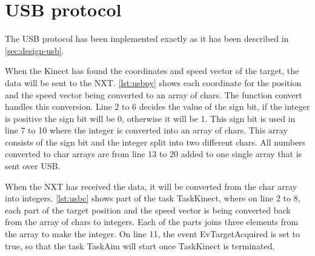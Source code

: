 \section{USB protocol}
The USB protocol has been implemented exactly as it has been described in \autoref{sec:design-usb}.

When the Kinect has found the coordinates and speed vector of the target, the data will be sent to the NXT. \autoref{lst:usbpy} shows each coordinate for the position and the speed vector being converted to an array of chars. The function convert handles this conversion. Line 2 to 6 decides the value of the sign bit, if the integer is positive the sign bit will be 0, otherwise it will be 1. This sign bit is used in line 7 to 10 where the integer is converted into an array of chars. This array consists of the sign bit and the integer split into two different chars.
All numbers converted to char arrays are from line 13 to 20 added to one single array that is sent over USB.



When the NXT has received the data, it will be converted from the char array into integers. \autoref{lst:usbc} shows part of the task TaskKinect, where on line 2 to 8, each part of the target position and the speed vector is being converted back from the array of chars to integers. Each of the parts joins three elements from the array to make the integer. 
On line 11, the event EvTargetAcquired is set to true, so that the task TaskAim will start once TaskKinect is terminated.

